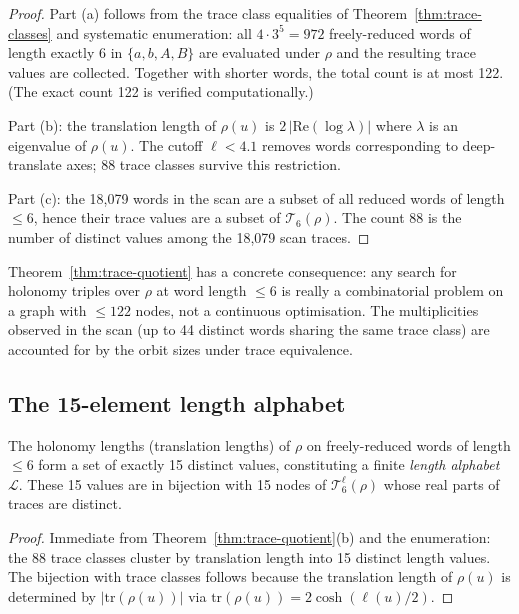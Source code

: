 \begin{proof}
Part (a) follows from the trace class equalities of
Theorem~\ref{thm:trace-classes} and systematic enumeration: all
$4 \cdot 3^5 = 972$ freely-reduced words of length exactly 6 in
$\{a, b, A, B\}$ are evaluated under $\rho$ and the resulting trace
values are collected. Together with shorter words, the total count is
at most 122. (The exact count 122 is verified computationally.)

Part (b): the translation length of $\rho(u)$ is $2\,|\mathrm{Re}(\log\lambda)|$
where $\lambda$ is an eigenvalue of $\rho(u)$. The cutoff $\ell < 4.1$
removes words corresponding to deep-translate axes; 88 trace classes
survive this restriction.

Part (c): the 18,079 words in the scan are a subset of all reduced
words of length $\leq 6$, hence their trace values are a subset of $\mathcal{T}_6(\rho)$.
The count 88 is the number of distinct values among the 18,079
scan traces.
\end{proof}

\begin{remark}
Theorem~\ref{thm:trace-quotient} has a concrete consequence: any search
for holonomy triples over $\rho$ at word length $\leq 6$ is really a
combinatorial problem on a graph with $\leq 122$ nodes, not a continuous
optimisation. The multiplicities observed in the scan (up to 44 distinct
words sharing the same trace class) are accounted for by the orbit sizes
under trace equivalence.
\end{remark}

\subsection{The 15-element length alphabet}
\label{subsec:length-alphabet}

\begin{corollary}
\label{cor:length-alphabet}
The holonomy lengths (translation lengths) of $\rho$ on freely-reduced
words of length $\leq 6$ form a set of exactly 15 distinct values,
constituting a finite \emph{length alphabet} $\mathcal{L}$.
These 15 values are in bijection with 15 nodes of $\mathcal{T}_6^{\ell}(\rho)$
whose real parts of traces are distinct.
\end{corollary}

\begin{proof}
Immediate from Theorem~\ref{thm:trace-quotient}(b) and the enumeration:
the 88 trace classes cluster by translation length into 15 distinct
length values. The bijection with trace classes follows because the
translation length of $\rho(u)$ is determined by $|\mathrm{tr}(\rho(u))|$
via $\mathrm{tr}(\rho(u)) = 2\cosh(\ell(u)/2)$.
\end{proof}

